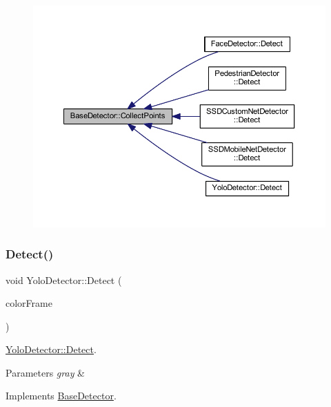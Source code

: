 \begin{figure}[H]
\begin{center}
\leavevmode
\includegraphics[width=350pt]{class_base_detector_a20380b0980c6f262b0829f37fb89d2a7_icgraph}
\end{center}
\end{figure}
\mbox{\label{class_yolo_detector_a4c4232e3198a50666e6b4ed9d00bf42c}} 
\subsubsection{\texorpdfstring{Detect()}{Detect()}}
{\footnotesize\ttfamily void Yolo\+Detector\+::\+Detect (\begin{DoxyParamCaption}\item[{cv\+::\+U\+Mat \&}]{color\+Frame }\end{DoxyParamCaption})\hspace{0.3cm}{\ttfamily [virtual]}}



\mbox{\hyperlink{class_yolo_detector_a4c4232e3198a50666e6b4ed9d00bf42c}{Yolo\+Detector\+::\+Detect}}. 


\begin{DoxyParams}{Parameters}
{\em gray} & \\
\hline
\end{DoxyParams}


Implements \mbox{\hyperlink{class_base_detector_a9c9dedfffb7673fd2995f24bdb9ade18}{Base\+Detector}}.



